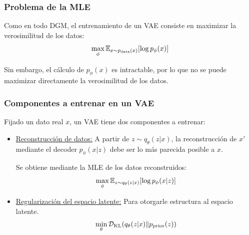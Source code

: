 \documentclass{beamer}
\begin{document}
\begin{frame}
    \frametitle{Problema de la MLE}

    Como en todo DGM, el entrenamiento de un VAE consiste en maximizar la verosimilitud de los datos:
    \begin{equation*}
        \max_{\phi} \mathbb{E}_{x\sim p_{\text{data}}(x)}[\log p_\phi(x)]
    \end{equation*}\pause

    Sin embargo, el cálculo de $p_\phi(x)$ es intractable, por lo que no se puede maximizar directamente la verosimilitud de los datos.
\end{frame}
\begin{frame}
    \frametitle{Componentes a entrenar en un VAE}

    Fijado un dato real $x$, un VAE tiene dos componentes a entrenar:
    \begin{itemize}
        \item \ul{Reconstrucción de datos:} A partir de $z\sim q_\theta(z|x)$, la reconstrucción de $x'$ mediante el decoder $p_\phi(x|z)$ debe ser lo más parecida posible a $x$.
        
        Se obtiene mediante la MLE de los datos reconstruidos:
        \begin{equation*}
            \max_{\phi} \mathbb{E}_{z\sim q_\theta(z|x)}[\log p_\phi(x|z)]
        \end{equation*}\pause
        \item \ul{Regularización del espacio latente:} Para otorgarle estructura al espacio latente.
        \begin{equation*}
            \min_{\theta} \mathcal{D}_{\text{KL}}(q_\theta(z|x)\| p_{\text{prior}}(z))
        \end{equation*}
    \end{itemize}
\end{frame}
\end{document}
